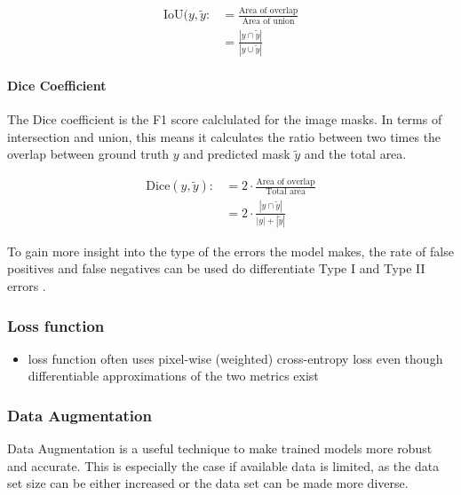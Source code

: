 \begin{align}
	\text{IoU}(y, \tilde{y} :&= \frac{\text{Area of overlap}}{\text{Area of union}}\\
	&=\frac{|y \cap \tilde{y}|}{|y \cup \tilde {y}|}
\end{align}


\paragraph{Dice Coefficient}

The Dice coefficient is the F1 score calclulated for the image masks. In terms of intersection and union, this means it calculates the ratio between two times the overlap between ground truth $y$ and predicted mask $\tilde{y}$ and the total area.

\begin{align}
	\text{Dice}(y, \tilde{y}) :&= 2 \cdot \frac{\text{Area of overlap}}{\text{Total area}}\\
	&= 2 \cdot \frac{|y \cap \tilde{y}|}{|y| + |\tilde{y}|}
\end{align}

To gain more insight into the type of the errors the model makes, the rate of false positives and false negatives can be used do differentiate Type I and Type II errors \cite{DFUC2022}.


\subsubsection{Loss function}

\begin{itemize}
	\item loss function often uses pixel-wise (weighted) cross-entropy loss even though differentiable approximations of the two metrics exist \cite{Eelbode}
\end{itemize}


\subsubsection{Data Augmentation}

Data Augmentation is a useful technique to make trained models more robust and accurate. This is especially the case if available data is limited, as the data set size can be either increased or the data set can be made more diverse.

